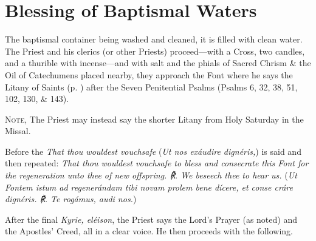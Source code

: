 \section{Blessing of Baptismal Waters}
\fancyhead[RE,LO]{}
\begin{rubric}
    The baptismal container being washed and cleaned, it is filled with clean water. The Priest and his clerics (or other Priests) proceed---with a Cross, two candles, and a thurible with incense---and with salt and the phials of Sacred Chrism \& the Oil of Catechumens placed nearby, they approach the Font where he says the Litany of Saints (p. \pageref{LitanySaints}) after the Seven Penitential Psalms (Psalms 6, 32, 38, 51, 102, 130, \& 143).\par
    \textsc{Note,} The Priest may instead say the shorter Litany from Holy Saturday in the Missal.
\end{rubric}
\begin{rubric}
    Before the \emph{That thou wouldest vouchsafe} (\emph{Ut nos exáudire dignéris,}) is said and then repeated: \emph{That thou wouldest vouchsafe to {} bless and {} consecrate this Font for the regeneration unto thee of new offspring. ℟. We beseech thee to hear us.} (\emph{Ut Fontem istum ad regenerándam tibi novam prolem bene {} dícere, et conse {} cráre dignéris. ℟. Te rogámus, audi nos.})
\end{rubric}
\begin{rubric}
    After the final \emph{Kyrie, eléison}, the Priest says the Lord's Prayer (as noted) and the Apostles' Creed, all in a clear voice. He then proceeds with the following.
\end{rubric}






\oremus

